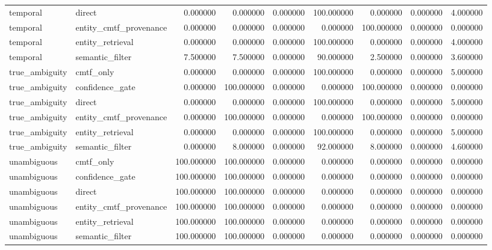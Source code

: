 \begin{tabular}{llrrrrrrr}
temporal & direct & 0.000000 & 0.000000 & 0.000000 & 100.000000 & 0.000000 & 0.000000 & 4.000000 \\
temporal & entity_cmtf_provenance & 0.000000 & 0.000000 & 0.000000 & 0.000000 & 100.000000 & 0.000000 & 0.000000 \\
temporal & entity_retrieval & 0.000000 & 0.000000 & 0.000000 & 100.000000 & 0.000000 & 0.000000 & 4.000000 \\
temporal & semantic_filter & 7.500000 & 7.500000 & 0.000000 & 90.000000 & 2.500000 & 0.000000 & 3.600000 \\
true_ambiguity & cmtf_only & 0.000000 & 0.000000 & 0.000000 & 100.000000 & 0.000000 & 0.000000 & 5.000000 \\
true_ambiguity & confidence_gate & 0.000000 & 100.000000 & 0.000000 & 0.000000 & 100.000000 & 0.000000 & 0.000000 \\
true_ambiguity & direct & 0.000000 & 0.000000 & 0.000000 & 100.000000 & 0.000000 & 0.000000 & 5.000000 \\
true_ambiguity & entity_cmtf_provenance & 0.000000 & 100.000000 & 0.000000 & 0.000000 & 100.000000 & 0.000000 & 0.000000 \\
true_ambiguity & entity_retrieval & 0.000000 & 0.000000 & 0.000000 & 100.000000 & 0.000000 & 0.000000 & 5.000000 \\
true_ambiguity & semantic_filter & 0.000000 & 8.000000 & 0.000000 & 92.000000 & 8.000000 & 0.000000 & 4.600000 \\
unambiguous & cmtf_only & 100.000000 & 100.000000 & 0.000000 & 0.000000 & 0.000000 & 0.000000 & 0.000000 \\
unambiguous & confidence_gate & 100.000000 & 100.000000 & 0.000000 & 0.000000 & 0.000000 & 0.000000 & 0.000000 \\
unambiguous & direct & 100.000000 & 100.000000 & 0.000000 & 0.000000 & 0.000000 & 0.000000 & 0.000000 \\
unambiguous & entity_cmtf_provenance & 100.000000 & 100.000000 & 0.000000 & 0.000000 & 0.000000 & 0.000000 & 0.000000 \\
unambiguous & entity_retrieval & 100.000000 & 100.000000 & 0.000000 & 0.000000 & 0.000000 & 0.000000 & 0.000000 \\
unambiguous & semantic_filter & 100.000000 & 100.000000 & 0.000000 & 0.000000 & 0.000000 & 0.000000 & 0.000000 \\
\bottomrule
\end{tabular}
